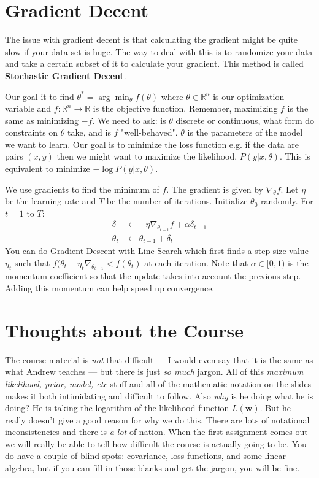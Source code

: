 \documentclass[twoside]{article}
\newcommand\w{\mathbf{w}}
\newcommand\R{\mathbb{R}}
\begin{document}
\section{Gradient Decent}
The issue with gradient decent is that calculating the gradient might be quite slow if your data set is huge. The way to deal with this is to randomize your data and take a certain subset of it to calculate your gradient. This method is called \textbf{Stochastic Gradient Decent}.

Our goal it to find $\theta^* = \arg\min_{\theta} f(\theta)$ where $\theta \in \R^n$ is our optimization variable and $f: \R^n \rightarrow \R$ is the objective function. Remember, maximizing $f$ is the same as minimizing $-f$. We need to ask: is $\theta$ discrete or continuous, what form do constraints on $\theta$ take, and is $f$ "well-behaved". $\theta$ is the parameters of the model we want to learn. Our goal is to minimize the loss function e.g. if the data are pairs $(x,y)$ then we might want to maximize the likelihood, $P(y | x, \theta)$. This is equivalent to minimize $-\log P(y|x, \theta)$. 

We use gradients to find the minimum of $f$. The gradient is given by $\nabla_{\theta}f$. Let $\eta$ be the learning rate and $T$ be the number of iterations. Initialize $\theta_0$ randomly. For $t = 1$ to $T$: 
\begin{align*}
\delta &\leftarrow -\eta\nabla_{\theta_{t-1}}f + \alpha\delta_{t-1}\\
\theta_t &\leftarrow \theta_{t-1} + \delta_t
\end{align*}
You can do Gradient Descent with Line-Search which first finds a step size value $\eta_t$ such that $f(\theta_t - \eta_t\nabla_{\theta_{t-1}} < f(\theta_t)$ at each iteration. Note that $\alpha \in [0,1)$ is the momentum coefficient so that the update takes into account the previous step. Adding this momentum can help speed up convergence.

\section{Thoughts about the Course}
The course material is \emph{not} that difficult --- I would even say that it is the same as what Andrew teaches --- but there is just \emph{so much} jargon. All of this \emph{maximum likelihood, prior, model, etc} stuff and all of the mathematic notation on the slides makes it both intimidating and difficult to follow. Also \emph{why} is he doing what he is doing? He is taking the logarithm of the likelihood function $L(\w)$. But he really doesn't give a good reason for why we do this. There are lots of notational inconsistencies and there is \emph{a lot} of nation. When the first assignment comes out we will really be able to tell how difficult the course is actually going to be. You do have a couple of blind spots: covariance, loss functions, and some linear algebra, but if you can fill in those blanks and get the jargon, you will be fine.
\end{document}
